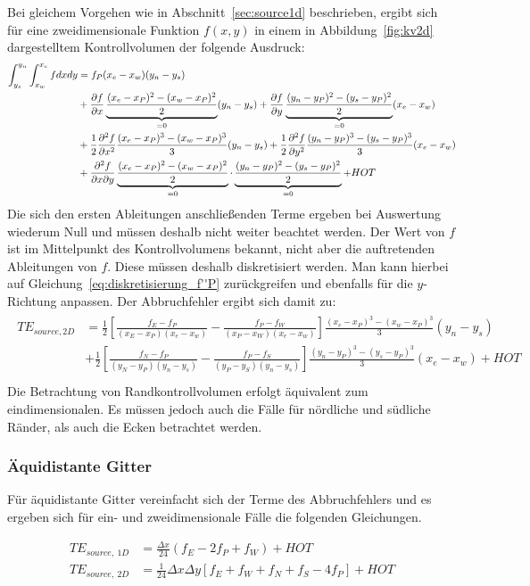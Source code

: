 Bei gleichem Vorgehen wie in Abschnitt~\ref{sec:source1d} beschrieben, ergibt sich für
eine zweidimensionale Funktion $f(x, y)$ in einem in Abbildung~\ref{fig:kv2d} 
dargestelltem Kontrollvolumen der folgende Ausdruck:
\begin{align*}
  \int_{y_s}^{y_n}\int_{x_w}^{x_e} f dx dy &= f_P (x_e-x_w)(y_n-y_s)\\
                                           &+ \frac{\partial f}{\partial x} \underbrace{\frac{(x_e-x_P)^2 - (x_w-x_P)^2}{2}}_{=0} (y_n-y_s)
  + \frac{\partial f}{\partial y} \underbrace{\frac{(y_n-y_P)^2-(y_s-y_P)^2}{2}}_{=0} (x_e-x_w) \\
  &+ \frac{1}{2} \frac{\partial^2 f}{\partial x^2}\frac{(x_e-x_P)^3 - (x_w-x_P)^3}{3} (y_n-y_s)
  + \frac{1}{2} \frac{\partial^2 f}{\partial y^2} \frac{(y_n-y_P)^3-(y_s-y_P)^3}{3} (x_e-x_w) \\
  &+ \frac{\partial^2 f}{\partial x\partial y} \underbrace{\frac{(x_e-x_P)^2 - (x_w-x_P)^2}{2}}_{=0} \cdot
  \underbrace{\frac{(y_n-y_P)^2-(y_s-y_P)^2}{2}}_{=0} + HOT
\end{align*}
Die sich den ersten Ableitungen anschließenden Terme ergeben bei Auswertung wiederum Null
und müssen deshalb nicht weiter beachtet werden.
Der Wert von $f$ ist im Mittelpunkt des Kontrollvolumens bekannt, nicht aber die auftretenden
Ableitungen von $f$. Diese müssen deshalb diskretisiert werden. Man kann hierbei auf
Gleichung~\eqref{eq:diskretisierung_f''P} zurückgreifen und ebenfalls für die $y$-Richtung anpassen.
Der Abbruchfehler ergibt sich damit zu:
\begin{align}
  \begin{split}
  TE_{source, 2D} &=                \frac{1}{2}
  \left[{\frac{f_E-f_P}{(x_E-x_P)(x_e-x_w)}-\frac{f_P-f_W}{(x_P-x_W)(x_e-x_w)}  }\right]
  \frac{(x_e-x_P)^3 - (x_w-x_P)^3}{3} (y_n-y_s)\\
  &+ \frac{1}{2}
  \left[{\frac{f_N-f_P}{(y_N-y_P)(y_n-y_s)}-\frac{f_P-f_S}{(y_P-y_S)(y_n-y_s)}  }\right]
  \frac{(y_n-y_P)^3-(y_s-y_P)^3}{3} (x_e-x_w)+HOT \\
  \end{split}
\end{align}
Die Betrachtung von Randkontrollvolumen erfolgt äquivalent zum eindimensionalen. Es müssen
jedoch auch die Fälle für nördliche und südliche Ränder, als auch die Ecken betrachtet werden.


\subsubsection{Äquidistante Gitter}

Für äquidistante Gitter vereinfacht sich der Terme des Abbruchfehlers und es ergeben sich
für ein- und zweidimensionale Fälle die folgenden Gleichungen.

\begin{align*}
  TE_{source,\ 1D} &= \frac{\Delta x}{24} \left({f_E-2f_P+f_W}\right) + HOT\\
  TE_{source,\ 2D} &= \frac{1}{24} \Delta x \Delta y \left[{f_E+f_W+f_N+f_S - 4f_P} \right] + HOT
\end{align*}

\newpage
